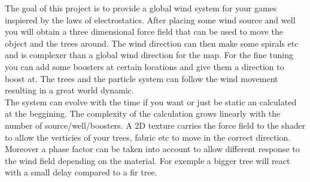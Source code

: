 \documentclass[../main.tex]{subfile}
\begin{document}
    The goal of this project is to provide a global wind system for your games inspiered by the laws of electrostatics. After placing 
    some wind source and well you will obtain a three dimensional force field that can be used to move the object and the trees around.
    The wind direction can then make some spirals etc and is complexer than a global wind direction for the map.
    For the fine tuning you can add some boosters at certain locations and give them a direction to boost at. The trees and the particle
    system can follow the wind movement resulting in a great world dynamic.\\

    The system can evolve with the time if you want or just be static an calculated at the beggining. The complexity of the
    calculation grows linearly with the number of source/well/boosters.
    A 2D texture carries the force field to the shader to allow the verticies of your trees, fabric etc to move in the correct direction.
    Moreover a phase factor can be taken into account to allow different response to the wind field depending on the material.
    For exemple a bigger tree will react with a small delay compared to a fir tree.
\end{document}
